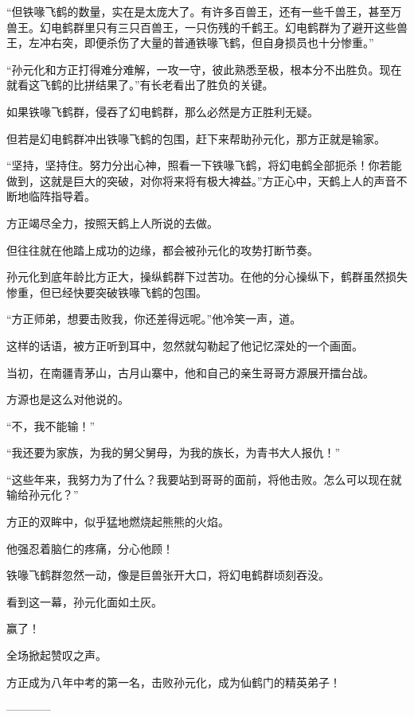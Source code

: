 \begin{this_body}
“但铁喙飞鹤的数量，实在是太庞大了。有许多百兽王，还有一些千兽王，甚至万兽王。幻电鹤群里只有三只百兽王，一只伤残的千鹤王。幻电鹤群为了避开这些兽王，左冲右突，即便杀伤了大量的普通铁喙飞鹤，但自身损员也十分惨重。”

“孙元化和方正打得难分难解，一攻一守，彼此熟悉至极，根本分不出胜负。现在就看这飞鹤的比拼结果了。”有长老看出了胜负的关键。

如果铁喙飞鹤群，侵吞了幻电鹤群，那么必然是方正胜利无疑。

但若是幻电鹤群冲出铁喙飞鹤的包围，赶下来帮助孙元化，那方正就是输家。

“坚持，坚持住。努力分出心神，照看一下铁喙飞鹤，将幻电鹤全部扼杀！你若能做到，这就是巨大的突破，对你将来将有极大裨益。”方正心中，天鹤上人的声音不断地临阵指导着。

方正竭尽全力，按照天鹤上人所说的去做。

但往往就在他踏上成功的边缘，都会被孙元化的攻势打断节奏。

孙元化到底年龄比方正大，操纵鹤群下过苦功。在他的分心操纵下，鹤群虽然损失惨重，但已经快要突破铁喙飞鹤的包围。

“方正师弟，想要击败我，你还差得远呢。”他冷笑一声，道。

这样的话语，被方正听到耳中，忽然就勾勒起了他记忆深处的一个画面。

当初，在南疆青茅山，古月山寨中，他和自己的亲生哥哥方源展开擂台战。

方源也是这么对他说的。

“不，我不能输！”

“我还要为家族，为我的舅父舅母，为我的族长，为青书大人报仇！”

“这些年来，我努力为了什么？我要站到哥哥的面前，将他击败。怎么可以现在就输给孙元化？”

方正的双眸中，似乎猛地燃烧起熊熊的火焰。

他强忍着脑仁的疼痛，分心他顾！

铁喙飞鹤群忽然一动，像是巨兽张开大口，将幻电鹤群顷刻吞没。

看到这一幕，孙元化面如土灰。

赢了！

全场掀起赞叹之声。

方正成为八年中考的第一名，击败孙元化，成为仙鹤门的精英弟子！

------------

\end{this_body}


